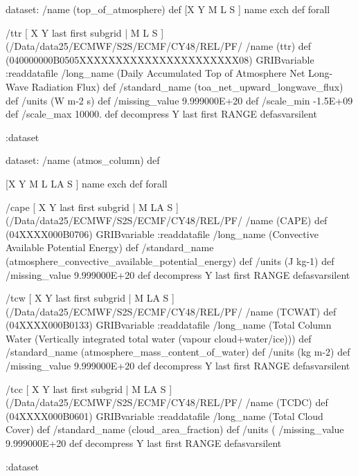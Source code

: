 \begin{ingrid}

dataset:
/name (top_of_atmosphere) def
[X Y M L S ] {name exch def } forall

/ttr { [ X Y last first subgrid | M L S ] (/Data/data25/ECMWF/S2S/ECMF/CY48/REL/PF/%
/name (ttr) def
(040000000B0505XXXXXXXXXXXXXXXXXXXXXX08) GRIBvariable
:readdatafile
/long_name (Daily Accumulated Top of Atmosphere Net Long-Wave Radiation Flux) def
/standard_name (toa_net_upward_longwave_flux) def
/units (W m-2 s) def
/missing_value 9.999000E+20 def
/scale_min -1.5E+09 def
/scale_max 10000. def
decompress
Y last first RANGE
} defasvarsilent

:dataset

dataset:
/name (atmos_column) def

[X Y M L LA S ] {name exch def } forall


/cape { [ X Y last first subgrid | M LA S ] (/Data/data25/ECMWF/S2S/ECMF/CY48/REL/PF/%
/name (CAPE) def
(04XXXX000B0706) GRIBvariable
:readdatafile
/long_name (Convective Available Potential Energy) def
/standard_name (atmosphere_convective_available_potential_energy) def
/units (J kg-1) def
/missing_value 9.999000E+20 def
decompress
Y last first RANGE
} defasvarsilent


/tcw { [ X Y last first subgrid | M LA S ] (/Data/data25/ECMWF/S2S/ECMF/CY48/REL/PF/%
/name (TCWAT) def
(04XXXX000B0133) GRIBvariable
:readdatafile
/long_name (Total Column Water (Vertically integrated total water (vapour cloud+water/ice))) def
/standard_name (atmosphere_mass_content_of_water) def
/units (kg m-2) def
/missing_value 9.999000E+20 def
decompress
Y last first RANGE
} defasvarsilent


/tcc { [ X Y last first subgrid | M LA S ] (/Data/data25/ECMWF/S2S/ECMF/CY48/REL/PF/%
/name (TCDC) def
(04XXXX000B0601) GRIBvariable
:readdatafile
/long_name (Total Cloud Cover) def
/standard_name (cloud_area_fraction) def
/units (%
/missing_value 9.999000E+20 def
decompress
Y last first RANGE
} defasvarsilent

:dataset

\end{ingrid}
